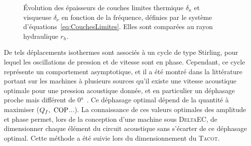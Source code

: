 \begin{figure}[!ht]
    \centering
    
    \caption{\'Evolution des épaisseurs de couches limites thermique $\delta_\kappa$ et visqueuse $\delta_\nu$ en fonction de la fréquence, définies par le système d'équations~\eqref{eq:CouchesLimites}. Elles sont comparées au rayon hydraulique $r_h$.}
    \label{fig:dKdV}
\end{figure}

De tels déplacements isothermes sont associés à un cycle de type Stirling, pour lequel les oscillations de pression et de vitesse sont en phase. Cependant, ce cycle représente un comportement asymptotique, et il a été montré dans la littérature portant sur les machines à plusieurs sources qu'il existe une vitesse acoustique optimale pour une pression acoustique donnée, et en particulier un déphasage proche mais différent de \ang{0}~\cite{poignand_analysis_2013, poignand_etude_2006, poignand_optimal_2007, poignand_thermoacoustic_2011}. Ce déphasage optimal dépend de la quantité à maximiser ($Q_f,\ \mathrm{COP}$...). La connaissance de ces valeurs optimales des amplitude et phase permet, lors de la conception d'une machine sous \textsc{DeltaEC}, de dimensionner chaque élément du circuit acoustique sans s'écarter de ce déphasage optimal. Cette méthode a été suivie lors du dimensionnement du \textsc{Tacot}.\medskip

